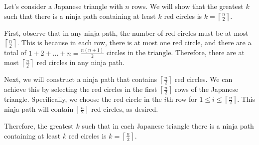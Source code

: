 Let's consider a Japanese triangle with $n$ rows. We will show that the greatest $k$ such that there is a ninja path containing at least $k$ red circles is $k = \left\lceil \frac{n}{2} \right\rceil$.

First, observe that in any ninja path, the number of red circles must be at most $\left\lceil \frac{n}{2} \right\rceil$. This is because in each row, there is at most one red circle, and there are a total of $1 + 2 + \dots + n = \frac{n(n+1)}{2}$ circles in the triangle. Therefore, there are at most $\left\lceil \frac{n}{2} \right\rceil$ red circles in any ninja path.

Next, we will construct a ninja path that contains $\left\lceil \frac{n}{2} \right\rceil$ red circles. We can achieve this by selecting the red circles in the first $\left\lceil \frac{n}{2} \right\rceil$ rows of the Japanese triangle. Specifically, we choose the red circle in the $i$th row for $1 \leq i \leq \left\lceil \frac{n}{2} \right\rceil$. This ninja path will contain $\left\lceil \frac{n}{2} \right\rceil$ red circles, as desired.

Therefore, the greatest $k$ such that in each Japanese triangle there is a ninja path containing at least $k$ red circles is $k = \left\lceil \frac{n}{2} \right\rceil$.
